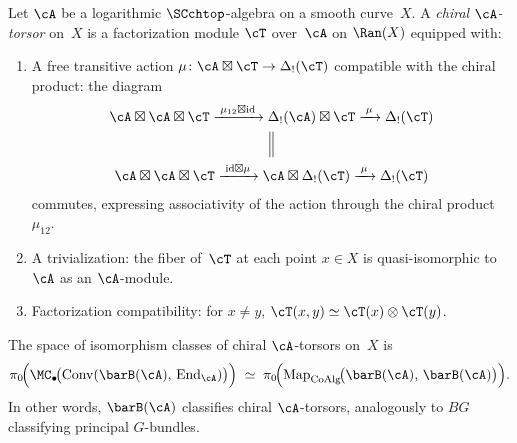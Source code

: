 \begin{definition}
\label{def:chiral-torsor}
Let $\cA$ be a logarithmic $\SCchtop$-algebra on a smooth
curve~$X$. A \emph{chiral $\cA$-torsor} on~$X$ is a
factorization module $\cT$ over~$\cA$ on $\Ran(X)$ equipped with:
\begin{enumerate}[label=\textup{(\roman*)}]
\item A free transitive action
 $\mu\colon \cA \boxtimes \cT \to \Delta_!(\cT)$
 compatible with the chiral product: the diagram
 \[
 \begin{gathered}
 \cA \boxtimes \cA \boxtimes \cT
 \xrightarrow{\;\mu_{12} \boxtimes \mathrm{id}\;}
 \Delta_!(\cA) \boxtimes \cT
 \xrightarrow{\;\mu\;}
 \Delta_!(\cT) \\
 \Big\Vert \\
 \cA \boxtimes \cA \boxtimes \cT
 \xrightarrow{\;\mathrm{id} \boxtimes \mu\;}
 \cA \boxtimes \Delta_!(\cT)
 \xrightarrow{\;\mu\;}
 \Delta_!(\cT)
 \end{gathered}
 \]
 commutes, expressing associativity of the action through the
 chiral product $\mu_{12}$.
\item A trivialization: the fiber of~$\cT$ at each point
 $x \in X$ is quasi-isomorphic to~$\cA$ as an
 $\cA$-module.
\item Factorization compatibility: for $x \neq y$,
 $\cT(x,y) \simeq \cT(x) \otimes \cT(y)$.
\end{enumerate}
\end{definition}

\begin{corollary}
\label{cor:classifying-space}
The space of isomorphism classes of chiral $\cA$-torsors on~$X$
is
\begin{equation}\label{eq:classifying-space}
\pi_0\!\Big(\MC_\bullet\!\bigl(
 \mathrm{Conv}(\barB(\cA),\, \mathrm{End}_\cA)
\bigr)\Big)
\;\simeq\;
\pi_0\!\Big(
 \mathrm{Map}_{\mathrm{CoAlg}}\!\bigl(
 \barB(\cA),\, \barB(\cA)
 \bigr)
\Big).
\end{equation}
In other words, $\barB(\cA)$ classifies chiral $\cA$-torsors,
analogously to $BG$ classifying principal $G$-bundles.
\end{corollary}

